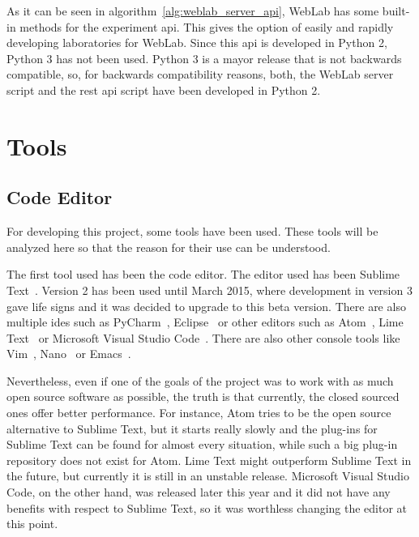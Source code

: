 As it can be seen in algorithm~\ref{alg:weblab_server_api}, WebLab has some built-in methods for the
experiment \acrshort{api}. This gives the option of easily and rapidly developing laboratories for
WebLab. Since this \acrshort{api} is developed in Python 2, Python 3 has not been used. Python 3 is
a mayor release that is not backwards compatible, so, for backwards compatibility reasons, both, the
WebLab server script and the \acrshort{rest} \acrshort{api} script have been developed in Python 2.

\section{Tools}

\subsection{Code Editor}

For developing this project, some tools have been used. These tools will be analyzed here so that
the reason for their use can be understood.

The first tool used has been the code editor. The editor used has been Sublime
Text~\cite{sublime_web}. Version 2 has been used until March 2015, where development in version 3
gave life signs and it was decided to upgrade to this beta version. There are also multiple
\acrshort{ide}s such as PyCharm~\cite{pycharm_web}, Eclipse~\cite{eclipse_web} or other editors such
as Atom~\cite{atom_web}, Lime Text~\cite{lime_web} or Microsoft Visual Studio
Code~\cite{ms_code_web}. There are also other console tools like Vim~\cite{vim_web},
Nano~\cite{nano_web} or Emacs~\cite{emacs_web}.

Nevertheless, even if one of the goals of the project was to work with as much open source software
as possible, the truth is that currently, the closed sourced ones offer better performance. For
instance, Atom tries to be the open source alternative to Sublime Text, but it starts really slowly
and the plug-ins for Sublime Text can be found for almost every situation, while such a big plug-in
repository does not exist for Atom. Lime Text might outperform Sublime Text in the future, but
currently it is still in an unstable release. Microsoft Visual Studio Code, on the other hand, was
released later this year and it did not have any benefits with respect to Sublime Text, so it was
worthless changing the editor at this point.

